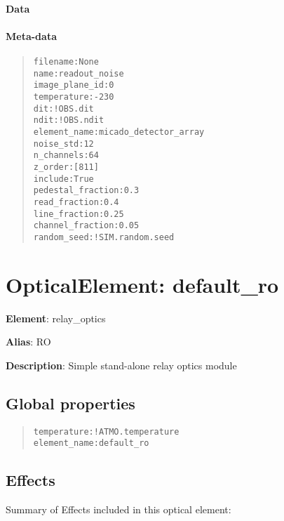 \documentclass[a4paper]{article}
\begin{document}
\paragraph{Data%
  \label{id37}%
}


\paragraph{Meta-data%
  \label{id38}%
}

\begin{quote}
\begin{alltt}
         filename : None
             name : readout_noise
   image_plane_id : 0
      temperature : -230
              dit : !OBS.dit
             ndit : !OBS.ndit
     element_name : micado_detector_array
        noise_std : 12
       n_channels : 64
          z_order : [811]
          include : True
pedestal_fraction : 0.3
    read_fraction : 0.4
    line_fraction : 0.25
 channel_fraction : 0.05
      random_seed : !SIM.random.seed
\end{alltt}
\end{quote}


\section{OpticalElement: \textquotedbl{}default\_ro\textquotedbl{}%
  \label{opticalelement-default-ro}%
}

\textbf{Element}: relay\_optics

\textbf{Alias}: RO

\textbf{Description}: Simple stand-alone relay optics module


\subsection{Global properties%
  \label{id39}%
}

\begin{quote}
\begin{alltt}
 temperature : !ATMO.temperature
element_name : default_ro
\end{alltt}
\end{quote}


\subsection{Effects%
  \label{id40}%
}

Summary of Effects included in this optical element:
\end{document}
